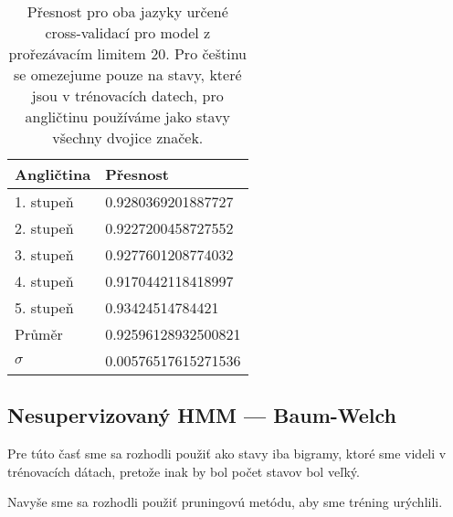 \documentclass[a4paper, 10.5pt]{article}
\begin{document}
\begin{table}[H]
\centering
\begin{tabular}{ll}
\toprule
\textbf{Angličtina} & \textbf{Přesnost} \\
\midrule
1. stupeň & 0.9280369201887727 \\
2. stupeň & 0.9227200458727552 \\
3. stupeň & 0.9277601208774032 \\
4. stupeň & 0.9170442118418997 \\
5. stupeň & 0.93424514784421 \\
\midrule
Průměr   & 0.92596128932500821 \\
$\sigma$ & 0.00576517615271536 \\
\bottomrule
\end{tabular}
\caption{Přesnost pro oba jazyky určené cross-validací pro model z prořezávacím limitem 20. Pro češtinu se omezejume pouze na stavy, které jsou v trénovacích datech, pro angličtinu používáme jako stavy všechny dvojice značek.}
\end{table}

\subsection*{Nesupervizovaný HMM --- Baum-Welch}

Pre túto časť sme sa rozhodli použiť ako stavy iba bigramy, ktoré sme videli v trénovacích dátach, pretože inak by bol počet stavov bol veľký.

Navyše sme sa rozhodli použiť pruningovú metódu, aby sme tréning urýchlili.
\end{document}
